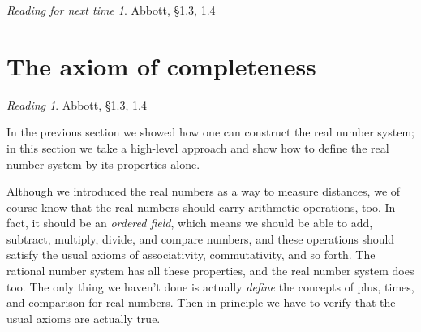 \documentclass[11pt,oneside]{amsbook}
\newcommand{\set}[1]{\left\{\,#1\,\right\}}
\theoremstyle{definition}
\newtheorem{exerc}{Exercise}[section]
\theoremstyle{plain}
\theoremstyle{definition}
\theoremstyle{remark}
\newtheorem*{reading}{Reading}
\newtheorem*{readnext}{Reading for next time}
\numberwithin{equation}{section}
\numberwithin{figure}{section}
\begin{document}
%



\begin{readnext}
  Abbott, \S 1.3, 1.4
\end{readnext}


\newpage
\section{The axiom of completeness}

\begin{reading}
  Abbott, \S 1.3, 1.4
\end{reading}

In the previous section we showed how one can construct the real number system; in this section we take a high-level approach and show how to define the real number system by its properties alone.

Although we introduced the real numbers as a way to measure distances, we of course know that the real numbers should carry arithmetic operations, too. In fact, it should be an \emph{ordered field}, which means we should be able to add, subtract, multiply, divide, and compare numbers, and these operations should satisfy the usual axioms of associativity, commutativity, and so forth. The rational number system has all these properties, and the real number system does too. The only thing we haven't done is actually \emph{define} the concepts of plus, times, and comparison for real numbers. Then in principle we have to verify that the usual axioms are actually true.
\end{document}
